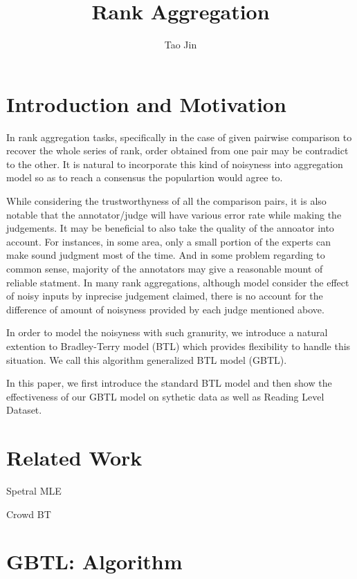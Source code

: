 \documentclass[]{article}
\title{Rank Aggregation}
\author{Tao Jin}
\date{}
\begin{document}
\maketitle

\hypertarget{introduction-and-motivation}{%
\section{Introduction and
Motivation}\label{introduction-and-motivation}}

In rank aggregation tasks, specifically in the case of given pairwise
comparison to recover the whole series of rank, order obtained from one
pair may be contradict to the other. It is natural to incorporate this
kind of noisyness into aggregation model so as to reach a consensus the
populartion would agree to.

While considering the trustworthyness of all the comparison pairs, it is
also notable that the annotator/judge will have various error rate while
making the judgements. It may be beneficial to also take the quality of
the annoator into account. For instances, in some area, only a small
portion of the experts can make sound judgment most of the time. And in
some problem regarding to common sense, majority of the annotators may
give a reasonable mount of reliable statment. In many rank aggregations,
although model consider the effect of noisy inputs by inprecise
judgement claimed, there is no account for the difference of amount of
noisyness provided by each judge mentioned above.

In order to model the noisyness with such granurity, we introduce a
natural extention to Bradley-Terry model (BTL) which provides
flexibility to handle this situation. We call this algorithm generalized
BTL model (GBTL).

In this paper, we first introduce the standard BTL model and then show
the effectiveness of our GBTL model on sythetic data as well as Reading
Level Dataset.

\hypertarget{related-work}{%
\section{Related Work}\label{related-work}}

Spetral MLE

Crowd BT

\hypertarget{gbtl-algorithm}{%
\section{GBTL: Algorithm}\label{gbtl-algorithm}}
\end{document}

